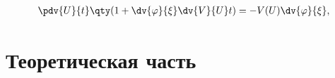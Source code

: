 

\begin{gather*} 
\pdv{U}{t}\qty(1 + \dv{\phi}{\xi} \dv{V}{U}t) =-V(U)\dv{\phi}{\xi}, 
\end{gather*}

\section{Теоретическая часть}

